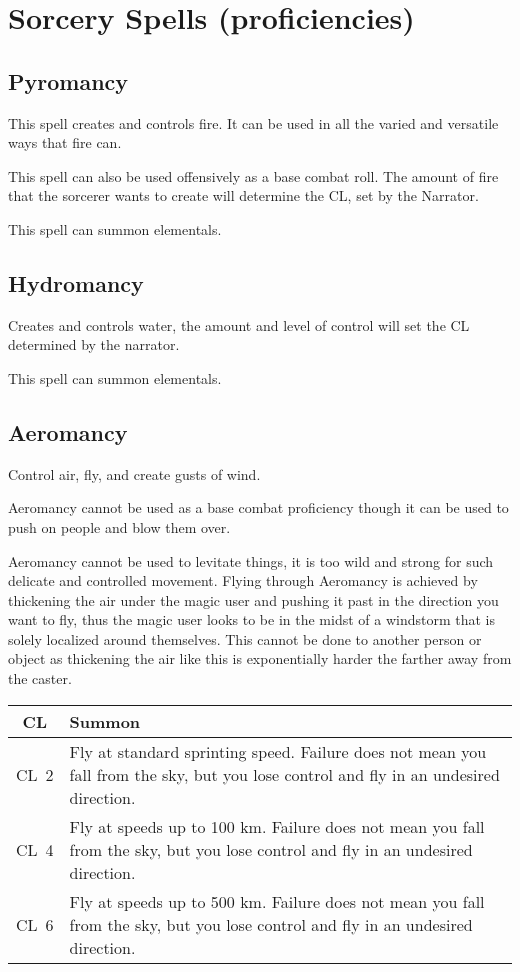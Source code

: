 \section{Sorcery Spells (proficiencies)}

\subsection{Pyromancy}

This spell creates and controls fire. It can be used in all the varied and versatile ways that fire can.

This spell can also be used offensively as a base combat roll. The amount of fire that the sorcerer wants to create will determine the CL, set by the Narrator.

This spell can summon elementals.

\subsection{Hydromancy}

Creates and controls water, the amount and level of control will set the CL determined by the narrator.

This spell can summon elementals.

\subsection{Aeromancy}

Control air, fly, and create gusts of wind.

Aeromancy cannot be used as a base combat proficiency though it can be used to push on people and blow them over.

Aeromancy cannot be used to levitate things, it is too wild and strong for such delicate and controlled movement. Flying through Aeromancy is achieved by thickening the air under the magic user and pushing it past in the direction you want to fly, thus the magic user looks to be in the midst of a windstorm that is solely localized around themselves. This cannot be done to another person or object as thickening the air like this is exponentially harder the farther away from the caster.

\begin{center}
    \begin{tabular}{|c m{}|} 
      \hline
      \textbf{CL} & \textbf{Summon} \\ 
      \hline
      CL~2 & Fly at standard sprinting speed. Failure does not mean you fall from the sky, but you lose control and fly in an undesired direction. \\ 
      CL~4 & Fly at speeds up to 100 km. Failure does not mean you fall from the sky, but you lose control and fly in an undesired direction. \\ 
      CL~6 & Fly at speeds up to 500 km. Failure does not mean you fall from the sky, but you lose control and fly in an undesired direction. \\
      \hline
    \end{tabular}
\end{center}

